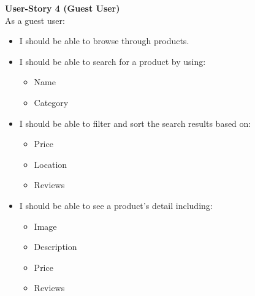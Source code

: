 \documentclass[11pt]{article}
\newcounter{use case ID}
\begin{document}
\textbf{User-Story 4 (Guest User)} \\
As a guest user:
\begin{itemize}
    \item I should be able to browse through products.
    \item I should be able to search for a product by using:
    \begin{itemize}
        \item Name
        \item Category
    \end{itemize}
    \item I should be able to filter and sort the search results based on:
        \begin{itemize}
            \item Price
            \item Location
            \item Reviews
        \end{itemize}
    \item I should be able to see a product's detail including:
        \begin{itemize}
            \item Image
            \item Description
            \item Price
            \item Reviews
        \end{itemize}
\end{itemize}
\end{document}
